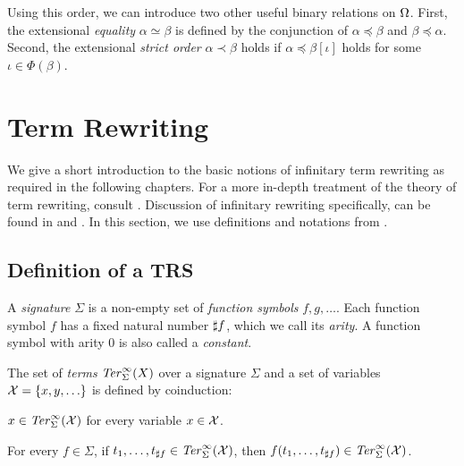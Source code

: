 Using this order, we can introduce two other useful binary relations
on $\Omega$. First, the extensional \emph{equality} $\alpha \simeq
\beta$ is defined by the conjunction of $\alpha \preceq \beta$ and
$\beta \preceq \alpha$. Second, the extensional \emph{strict order}
$\alpha \prec \beta$ holds if $\alpha \preceq \beta[\iota]$ holds for
some $\iota \in \Phi(\beta)$.



\section{Term Rewriting}\label{sec:rewriting}


We give a short introduction to the basic notions of infinitary term
rewriting as required in the following chapters. For a more in-depth
treatment of the theory of term rewriting, consult
\citet{terese-03}. Discussion of infinitary rewriting specifically,
can be found in \citet[Chap. 12]{terese-03} and
\citet{klop-de-vrijer-05}. In this section, we use definitions and
notations from \citet{terese-03}.


\subsection{Definition of a TRS}\label{sub:trs}

\begin{definition}%
A \emph{signature} $\Sigma$ is a non-empty set of \emph{function symbols} $f,
g, \ldots$. Each function symbol $f$ has a fixed natural number
$\sharp f$, which we call its \emph{arity}. A function symbol with
arity $0$ is also called a \emph{constant}.
\end{definition}

\begin{definition}%
The set of \emph{terms} $\mathit{Ter}_\Sigma^\infty(X)$ over a signature $\Sigma$ and a
set of variables $\mathcal{X} = \{x, y, \ldots\}$ is defined by coinduction:
\begin{compactenum}
  \item
    $x \in \mathit{Ter}_\Sigma^\infty(\mathcal{X})$ for every variable $x \in \mathcal{X}$.
  \item
    For every $f \in \Sigma$, if $t_1, \ldots, t_{\sharp f} \in
    \mathit{Ter}_\Sigma^\infty(\mathcal{X})$, then $f(t_1, \ldots, t_{\sharp f}) \in \mathit{Ter}_\Sigma^\infty(\mathcal{X})$.
\end{compactenum}
\end{definition}

